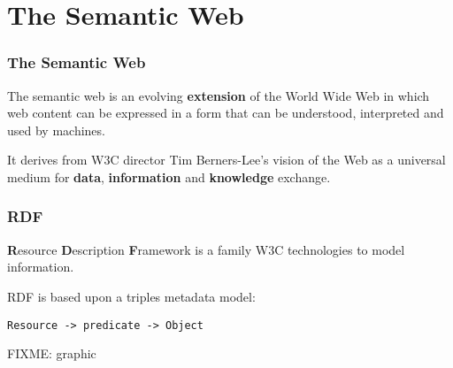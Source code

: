\documentclass[spanish,notes=hide,16pt]{beamer}
\begin{document}
\section{The Semantic Web}
\frame
{
  \frametitle{The Semantic Web}

  \begin{Large}
    The semantic web is an evolving \textbf{extension} of the World Wide Web in 
    which web content can be expressed in a form that can be understood, 
    interpreted and used by machines.
  \end{Large}
  
  \vspace{1cm}

  \begin{Large}
    It derives from W3C director Tim Berners-Lee's vision of the Web as a universal 
    medium for \textbf{data}, \textbf{information} and \textbf{knowledge} exchange.
  \end{Large}
}
\frame
{
  \frametitle{RDF}

  \begin{Large}
     \textbf{R}esource \textbf{D}escription \textbf{F}ramework is a family W3C
     technologies to model information.
  \end{Large}

  \vspace{1cm}

  \begin{Large}
     RDF is based upon a triples metadata model:
     \begin{center}
       \texttt{Resource -> predicate -> Object}
     \end{center}
  \end{Large}
  FIXME: graphic
}
\end{document}
